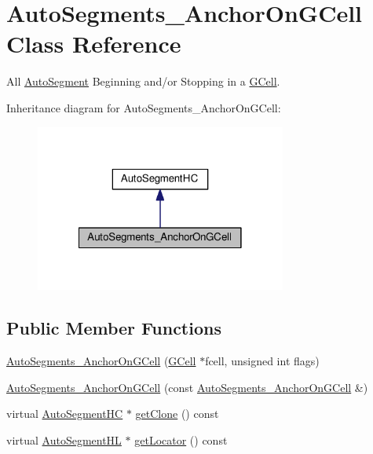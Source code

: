 \hypertarget{classKatabatic_1_1AutoSegments__AnchorOnGCell}{}\section{Auto\+Segments\+\_\+\+Anchor\+On\+G\+Cell Class Reference}
\label{classKatabatic_1_1AutoSegments__AnchorOnGCell}


All \hyperlink{classKatabatic_1_1AutoSegment}{Auto\+Segment} Beginning and/or Stopping in a \hyperlink{classKatabatic_1_1GCell}{G\+Cell}.  




Inheritance diagram for Auto\+Segments\+\_\+\+Anchor\+On\+G\+Cell\+:\nopagebreak
\begin{figure}[H]
\begin{center}
\leavevmode
\includegraphics[width=234pt]{classKatabatic_1_1AutoSegments__AnchorOnGCell__inherit__graph}
\end{center}
\end{figure}
\subsection*{Public Member Functions}
\begin{DoxyCompactItemize}
\item 
\hyperlink{classKatabatic_1_1AutoSegments__AnchorOnGCell_a41a8dace22db3bdd8ecbf1850344f885}{Auto\+Segments\+\_\+\+Anchor\+On\+G\+Cell} (\hyperlink{classKatabatic_1_1GCell}{G\+Cell} $\ast$fcell, unsigned int flags)
\item 
\hyperlink{classKatabatic_1_1AutoSegments__AnchorOnGCell_a4597cd793ef7f6a5be546b24863f99e8}{Auto\+Segments\+\_\+\+Anchor\+On\+G\+Cell} (const \hyperlink{classKatabatic_1_1AutoSegments__AnchorOnGCell}{Auto\+Segments\+\_\+\+Anchor\+On\+G\+Cell} \&)
\item 
virtual \hyperlink{namespaceKatabatic_acb3628dc7705fefe38a665cfe43efa6e}{Auto\+Segment\+HC} $\ast$ \hyperlink{classKatabatic_1_1AutoSegments__AnchorOnGCell_a5b26b0698bdcb40cbf51b250dfb21858}{get\+Clone} () const
\item 
virtual \hyperlink{namespaceKatabatic_a40ef13471fd0e797b75d3c436813fe65}{Auto\+Segment\+HL} $\ast$ \hyperlink{classKatabatic_1_1AutoSegments__AnchorOnGCell_a07665c070fcc269aec02ce842f384483}{get\+Locator} () const
\end{DoxyCompactItemize}


